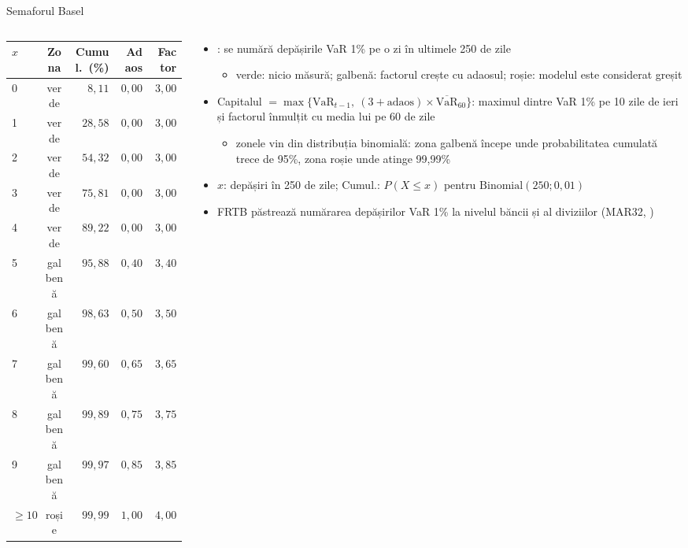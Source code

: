 \begin{frame}{Semaforul Basel}
\itemsize{\footnotesize}
\begin{columns}[T]
\begin{column}{0.44\textwidth}
\begin{center}
\scriptsize
\begin{tabular}{lcrrr}
\toprule
$x$ & Zona & Cumul.\ (\%) & Adaos & Factor \\
\midrule
0 & verde & $8{,}11$ & $0{,}00$ & $3{,}00$ \\
1 & verde & $28{,}58$ & $0{,}00$ & $3{,}00$ \\
2 & verde & $54{,}32$ & $0{,}00$ & $3{,}00$ \\
3 & verde & $75{,}81$ & $0{,}00$ & $3{,}00$ \\
4 & verde & $89{,}22$ & $0{,}00$ & $3{,}00$ \\
5 & galbenă & $95{,}88$ & $0{,}40$ & $3{,}40$ \\
6 & galbenă & $98{,}63$ & $0{,}50$ & $3{,}50$ \\
7 & galbenă & $99{,}60$ & $0{,}65$ & $3{,}65$ \\
8 & galbenă & $99{,}89$ & $0{,}75$ & $3{,}75$ \\
9 & galbenă & $99{,}97$ & $0{,}85$ & $3{,}85$ \\
$\ge 10$ & roșie & $99{,}99$ & $1{,}00$ & $4{,}00$ \\
\bottomrule
\end{tabular}
\end{center}

\end{column}
\begin{column}{0.54\textwidth}
\begin{itemize}
    \item {}: se numără depășirile VaR 1\% pe o zi în ultimele 250 de zile
    \begin{itemize}
        \item verde: nicio măsură; galbenă: factorul crește cu adaosul; roșie: modelul este considerat greșit
    \end{itemize}
    \item Capitalul $= \max\{\mathrm{VaR}_{t-1},\ (3 + \text{adaos}) \times \overline{\mathrm{VaR}}_{60}\}$: maximul dintre VaR 1\% pe 10 zile de ieri și factorul înmulțit cu media lui pe 60 de zile
    \begin{itemize}
        \item zonele vin din distribuția binomială: zona galbenă începe unde probabilitatea cumulată trece de 95\%, zona roșie unde atinge 99,99\%
    \end{itemize}
    \item $x$: depășiri în 250 de zile; Cumul.: $P(X \le x)$ pentru $\mathrm{Binomial}(250; 0{,}01)$
    \item FRTB păstrează numărarea depășirilor VaR 1\% la nivelul băncii și al diviziilor (MAR32, )
\end{itemize}
\end{column}
\end{columns}
\end{frame}

